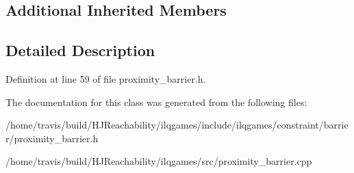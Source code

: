 \subsection*{Additional Inherited Members}


\subsection{Detailed Description}


Definition at line 59 of file proximity\+\_\+barrier.\+h.



The documentation for this class was generated from the following files\+:\begin{DoxyCompactItemize}
\item 
/home/travis/build/\+H\+J\+Reachability/ilqgames/include/ilqgames/constraint/barrier/proximity\+\_\+barrier.\+h\item 
/home/travis/build/\+H\+J\+Reachability/ilqgames/src/proximity\+\_\+barrier.\+cpp\end{DoxyCompactItemize}
